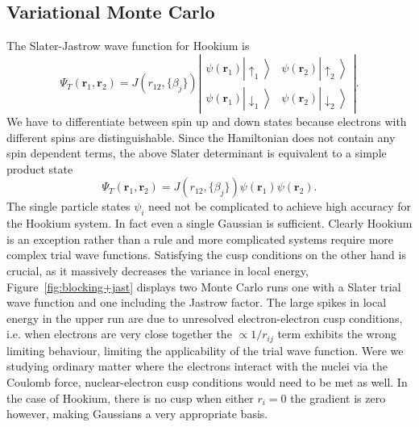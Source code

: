 \documentclass[final,3p,times,twocolumn]{elsarticle}
\begin{document}
	\subsection{Variational Monte Carlo}
	The Slater-Jastrow wave function for Hookium is
	\begin{equation}
		\Psi_{T}(\mathbf{r}_1, \mathbf{r}_2) = J(r_{12},\{\beta_{j}\})\left|
		\begin{array}{ll}\psi\left(\mathbf{r}_{1}\right)\left|\uparrow_{1}\right\rangle & \psi\left(\mathbf{r}_{2}\right)\left|\uparrow_{2}\right\rangle \\ \psi\left(\mathbf{r}_{1}\right)\left|\downarrow_{1}\right\rangle & \psi\left(\mathbf{r}_{2}\right)\left|\downarrow_{2}\right\rangle
		\end{array}
	\right|.
	\end{equation}
	We have to differentiate between spin up and down states because electrons with different spins are distinguishable. Since the Hamiltonian does not contain any spin dependent terms, the above Slater determinant is equivalent to a simple product state
	\begin{equation}
		\Psi_{T}\left(\mathbf{r}_{1}, \mathbf{r}_{2}\right)=J(r_{12},\{\beta_{j}\})\psi(\mathbf{r}_{1})\psi(\mathbf{r}_{2}).
	\end{equation}
	The single particle states $\psi_i$ need not be complicated to achieve high accuracy for the Hookium system. In fact even a single Gaussian is sufficient. Clearly Hookium is an exception rather than a rule and more complicated systems require more complex trial wave functions. Satisfying the cusp conditions on the other hand is crucial, as it massively decreases the variance in local energy, Figure~\ref{fig:blocking+jast} displays two Monte Carlo runs one with a Slater trial wave function and one including the Jastrow factor. The large spikes in local energy in the upper run are due to unresolved electron-electron cusp conditions, i.e. when electrons are very close together the $\propto 1/r_{ij}$ term exhibits the wrong limiting behaviour, limiting the applicability of the trial wave function. Were we studying ordinary matter where the electrons interact with the nuclei via the Coulomb force, nuclear-electron cusp conditions would need to be met as well. In the case of Hookium, there is no cusp when either $r_i = 0$ the gradient is zero however, making Gaussians a very appropriate basis. 
	
\end{document}
